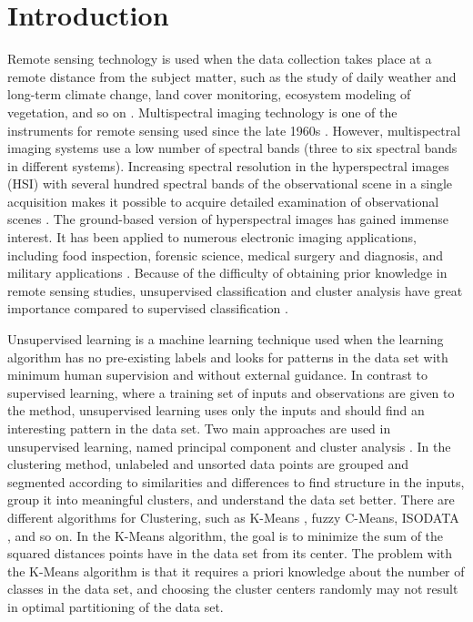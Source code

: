 \documentclass[a4paper, 10pt]{article}
\begin{document}


\section{Introduction}

Remote sensing technology is used when the data collection takes place at a
remote distance from the subject matter, such as the study of daily weather and
long-term climate change, land cover monitoring, ecosystem modeling of
vegetation, and so on \cite{Jensen1996,Mallapragada2018}. Multispectral imaging
technology is one of the instruments for remote sensing used since the late
1960s \cite{Khan2018,Landgrebe1999}. However, multispectral imaging systems use
a low number of spectral bands (three to six spectral bands in different
systems). Increasing spectral resolution in the hyperspectral images (HSI) with
several hundred spectral bands of the observational scene in a single
acquisition makes it possible to acquire detailed examination of observational
scenes \cite{Khan2018}. The ground-based version of hyperspectral images has
gained immense interest. It has been applied to numerous electronic imaging
applications, including food inspection, forensic science, medical surgery and
diagnosis, and military applications
\cite{Govender2009,Adam2009,Fischer2006,Carrasco2003}. Because of the difficulty
of obtaining prior knowledge in remote sensing studies, unsupervised
classification and cluster analysis have great importance compared to supervised
classification \cite{Abbas2016}.

Unsupervised learning is a machine learning technique used when the learning
algorithm has no pre-existing labels and looks for patterns in the data set with
minimum human supervision and without external guidance. In contrast to
supervised learning, where a training set of inputs and observations are given
to the method, unsupervised learning uses only the inputs and should find an
interesting pattern in the data set. Two main approaches are used in
unsupervised learning, named principal component \cite{Mallapragada2018} and
cluster analysis \cite{Xu2015}. In the clustering method, unlabeled and unsorted
data points are grouped and segmented according to similarities and differences
to find structure in the inputs, group it into meaningful clusters, and
understand the data set better. There are different algorithms for Clustering,
such as K-Means \cite{Lloyd1982,Macqueen1967}, fuzzy C-Means, ISODATA
\cite{Ball1965}, and so on. In the K-Means algorithm, the goal is to minimize
the sum of the squared distances points have in the data set from its center.
The problem with the K-Means algorithm is that it requires a priori knowledge
about the number of classes in the data set, and choosing the cluster centers
randomly may not result in optimal partitioning of the data set.
\end{document}

